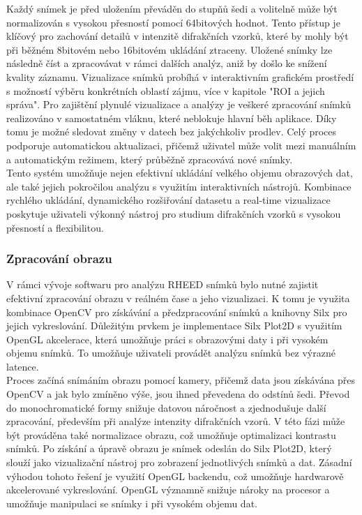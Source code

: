 \documentclass{article}
\begin{document}
Každý snímek je před uložením převáděn do stupňů šedi a volitelně může být normalizován s vysokou přesností pomocí 64bitových hodnot. Tento přístup je klíčový pro zachování detailů v intenzitě difrakčních vzorků, které by mohly být při běžném 8bitovém nebo 16bitovém ukládání ztraceny. Uložené snímky lze následně číst a zpracovávat v rámci dalších analýz, aniž by došlo ke snížení kvality záznamu. Vizualizace snímků probíhá v interaktivním grafickém prostředí s možností výběru konkrétních oblastí zájmu, více v kapitole "ROI a jejich správa". Pro zajištění plynulé vizualizace a analýzy je veškeré zpracování snímků realizováno v samostatném vláknu, které neblokuje hlavní běh aplikace. Díky tomu je možné sledovat změny v datech bez jakýchkoliv prodlev. Celý proces podporuje automatickou aktualizaci, přičemž uživatel může volit mezi manuálním a automatickým režimem, který průběžně zpracovává nové snímky.\\

Tento systém umožňuje nejen efektivní ukládání velkého objemu obrazových dat, ale také jejich pokročilou analýzu s využitím interaktivních nástrojů. Kombinace rychlého ukládání, dynamického rozšiřování datasetu a real-time vizualizace poskytuje uživateli výkonný nástroj pro studium difrakčních vzorků s vysokou přesností a flexibilitou.\\


\subsubsection{Zpracování obrazu}
V rámci vývoje softwaru pro analýzu RHEED snímků bylo nutné zajistit efektivní zpracování obrazu v reálném čase a jeho vizualizaci. K tomu je využita kombinace OpenCV pro získávání a předzpracování snímků a knihovny Silx pro jejich vykreslování. Důležitým prvkem je implementace Silx Plot2D s využitím OpenGL akcelerace, která umožňuje práci s obrazovými daty i při vysokém objemu snímků. To umožňuje uživateli provádět analýzu snímků bez výrazné latence.\\

Proces začíná snímáním obrazu pomocí kamery, přičemž data jsou získávána přes OpenCV a jak bylo zmíněno výše, jsou ihned převedena do odstínů šedi. Převod do monochromatické formy snižuje datovou náročnost a zjednodušuje další zpracování, především při analýze intenzity difrakčních vzorů. V této fázi může být prováděna také normalizace obrazu, což umožňuje optimalizaci kontrastu snímků. Po získání a úpravě obrazu je snímek odeslán do Silx Plot2D, který slouží jako vizualizační nástroj pro zobrazení jednotlivých snímků a dat. Zásadní výhodou tohoto řešení je využití OpenGL backendu, což umožňuje hardwarově akcelerované vykreslování. OpenGL významně snižuje nároky na procesor a umožňuje manipulaci se snímky i při vysokém objemu dat.\\
\end{document}
